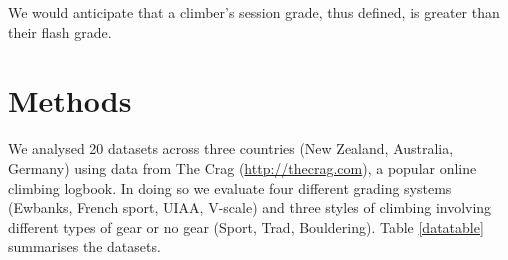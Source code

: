 \documentclass{article}
\begin{document}
{We would anticipate that a climber's session grade, thus defined, is greater than their flash grade. 

%
%
%
%
%
%

\section*{Methods}

We analysed 20 datasets across three countries (New Zealand, Australia, Germany) using data from The Crag (\url{http://thecrag.com}), a popular online climbing logbook. In doing so we evaluate four different grading systems (Ewbanks, French sport, UIAA, V-scale) and three styles of climbing involving different types of gear or no gear (Sport, Trad, Bouldering). Table \ref{datatable} summarises the datasets.


}
\end{document}
